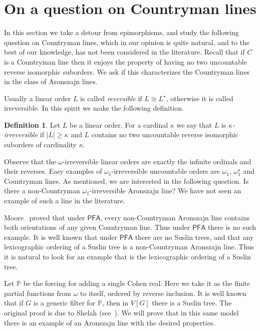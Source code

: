 \documentclass[10pt]{amsart}
\theoremstyle{definition}
\newtheorem{definition}[theorem]{Definition}
\theoremstyle{remark}
\newcommand{\axiom}[1]{\mathsf{#1}}
\newcommand{\PFA}{\axiom{PFA}}
\newcommand{\1}{\mathbbm{1}}
\begin{document}
\section{On a question on Countryman lines}\label{sec:irreversible}

In this section we take a detour from epimorphisms, and study
the following question on Countryman lines, which in our opinion is quite
natural, and to the best of our knowledge, has not been considered
in the literature.
Recall that if $C$ is a Countryman line then it enjoys the property
of having no two uncountable reverse isomorphic suborders.
We ask if this characterizes the Countryman lines in the class
of Aronszajn lines.

Usually a linear order $L$ is called \emph{reversible} if
$L \cong L^{\star}$, otherwise it is called irreversible. In
this spirit we make the following definition.

\begin{definition}\label{df:sirreversible}
  Let $L$ be a linear order. For a cardinal $\kappa$ we say that $L$ is
  \emph{$\kappa$-irreversible} if $|L| \ge \kappa$ and
  $L$ contains no two uncountable reverse
  isomorphic suborders of cardinality $\kappa$.
\end{definition}

Observe that the $\omega$-irreversible linear orders
are exactly the infinite ordinals and their reverses.
Easy examples of $\omega_{1}$-irreversible uncountable orders are
$\omega_{1}$, $\omega_{1}^{\star}$ and Countryman lines. As mentioned,
we are interested in the following question. Is there a non-Countryman
$\omega_{1}$-irreversible Aronszajn line?
We have not seen an example of such
a line in the literature.

Moore~\cite{Moore2009} proved that under
$\PFA$, every non-Countryman Aronszajn line contains both orientations
of any given Countryman line. Thus under $\PFA$ there is no such
example. It is well known that under $\PFA$ there are no Suslin trees, and that
any lexicographic ordering of a Suslin tree is a non-Countryman
Aronszajn line. Thus it is natural to look for an example that is
the lexicographic ordering of a Suslin tree.

Let $\mathbb{P}$ be the forcing for adding a single Cohen real. Here
we take it as the finite partial functions from $\omega$ to itself,
ordered by reverse inclusion. It is well known that if $G$ is a generic
filter for $\mathbb{P}$, then in $V[G]$ there is a Suslin tree. The
original proof is due to Shelah (see~\cite{Shelah1984}). We will
prove that in this same model there is an example of an Aronszajn
line with the desired properties.
\end{document}
